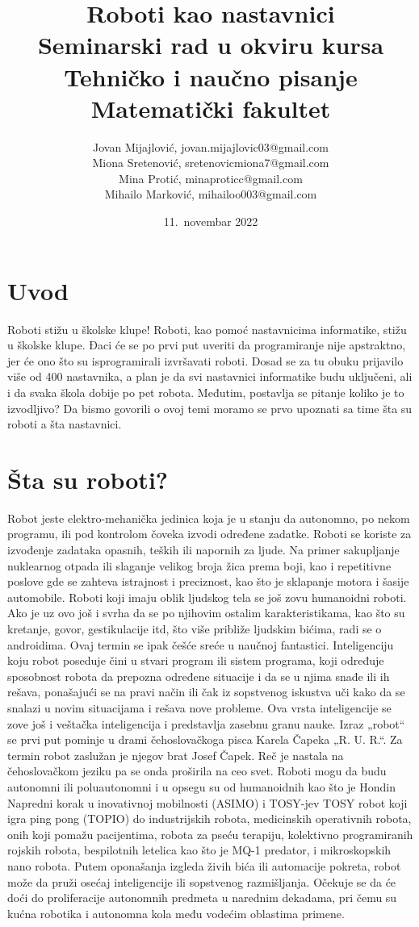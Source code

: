 \documentclass[a4paper]{article}
\title{Roboti kao nastavnici\small \\Seminarski rad u okviru kursa\\Tehničko i naučno pisanje\\Matematički fakultet}
\author{Jovan Mijajlović, jovan.mijajlovic03@gmail.com\\Miona Sretenović, sretenovicmiona7@gmail.com\\Mina Protić, minaproticc@gmail.com\\Mihailo Marković, mihailoo003@gmail.com}
\date{11.~novembar 2022}
\begin{document}
\maketitle
\tableofcontents
\newpage

\section{Uvod}

Roboti stižu u školske klupe!
Roboti, kao pomoć nastavnicima informatike, stižu u školske klupe. Đaci će se po prvi put uveriti da programiranje nije apstraktno, jer će ono što su isprogramirali izvršavati roboti. Dosad se za tu obuku prijavilo više od 400 nastavnika, a plan je da svi nastavnici informatike budu uključeni, ali i da svaka škola dobije po pet robota. Međutim, postavlja se pitanje koliko je to izvodljivo?
Da bismo govorili o ovoj temi moramo se prvo upoznati sa time šta su roboti a šta nastavnici.

\section{Šta su roboti?}
Robot jeste elektro-mehanička jedinica koja je u stanju da autonomno, po nekom programu, ili pod kontrolom čoveka izvodi određene zadatke. Roboti se koriste za izvođenje zadataka opasnih, teških ili napornih za ljude. Na primer sakupljanje nuklearnog otpada ili slaganje velikog broja žica prema boji, kao i repetitivne poslove gde se zahteva istrajnost i preciznost, kao što je sklapanje motora i šasije automobile.
Roboti koji imaju oblik ljudskog tela se još zovu humanoidni roboti. Ako je uz ovo još i svrha da se po njihovim ostalim karakteristikama, kao što su kretanje, govor, gestikulacije itd, što više približe ljudskim bićima, radi se o androidima. Ovaj termin se ipak češće sreće u naučnoj fantastici.
Inteligenciju koju robot poseduje čini u stvari program ili sistem programa, koji određuje sposobnost robota da prepozna određene situacije i da se u njima snađe ili ih rešava, ponašajući se na pravi način ili čak iz sopstvenog iskustva uči kako da se snalazi u novim situacijama i rešava nove probleme. Ova vrsta inteligencije se zove još i veštačka inteligencija i predstavlja zasebnu granu nauke. Izraz „robot“ se prvi put pominje u drami čehoslovačkoga pisca Karela Čapeka „R. U. R.“. Za termin robot zaslužan je njegov brat Josef Čapek. Reč je nastala na čehoslovačkom jeziku pa se onda proširila na ceo svet.
Roboti mogu da budu autonomni ili poluautonomni i u opsegu su od humanoidnih kao što je Hondin Napredni korak u inovativnoj mobilnosti (ASIMO) i TOSY-jev TOSY robot koji igra ping pong (TOPIO) do industrijskih robota, medicinskih operativnih robota, onih koji pomažu pacijentima, robota za pseću terapiju, kolektivno programiranih rojskih robota, bespilotnih letelica kao što je MQ-1 predator, i mikroskopskih nano robota. Putem oponašanja izgleda živih bića ili automacije pokreta, robot može da pruži osećaj inteligencije ili sopstvenog razmišljanja. Očekuje se da će doći do proliferacije autonomnih predmeta u narednim dekadama, pri čemu su kućna robotika i autonomna kola među vodećim oblastima primene.
\end{document}
